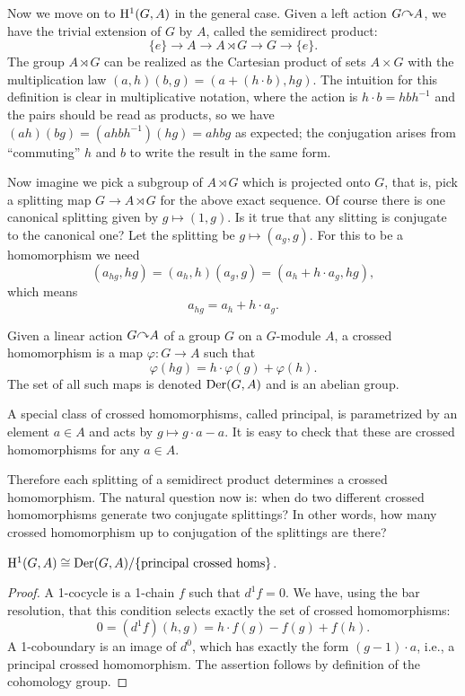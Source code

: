 Now we move on to $\mathrm{H}^1(G,A)$ in the general case. Given a left action $G\acts A$, we have the trivial extension of $G$ by $A$, called the semidirect product:
\[\{e\}\to A\to A\rtimes G \to G\to \{e\}.\]
The group $A\rtimes G$ can be realized as the Cartesian product of sets $A\times G$ with the multiplication law $(a,h)(b,g)=(a+(h\cdot b),hg)$. The intuition for this definition is clear in multiplicative notation, where the action is $h\cdot b=hbh^{-1}$ and the pairs should be read as products, so we have $(ah)(bg)=(ahbh^{-1})(hg)=ahbg$ as expected; the conjugation arises from ``commuting'' $h$  and $b$ to write the result in the same form.

Now imagine we pick a subgroup of $A\rtimes G$ which is projected onto $G$, that is, pick a splitting map $G\to A\rtimes G$ for the above exact sequence. Of course there is one canonical splitting given by $g\mapsto (1,g)$. Is it true that any slitting is conjugate to the canonical one? Let the splitting be $g\mapsto (a_g,g)$. For this to be a homomorphism we need
\[ (a_{hg},hg)=(a_h,h)(a_g,g)=(a_h +h\cdot a_g,hg),\]
which means
\[a_{hg}=a_h + h\cdot a_g.\]

\begin{defn}
    Given a linear action $G\acts A$ of a group $G$ on a $G$-module $A$, a crossed homomorphism is a map $\varphi:G\to A$ such that 
    \[\varphi(hg)=h\cdot \varphi(g)+\varphi(h).\]
    The set of all such maps is denoted $\operatorname{Der}(G,A)$ and is an abelian group.
\end{defn}
\begin{defn}
    A special class of crossed homomorphisms, called principal, is parametrized by an element $a\in A$ and acts by $g\mapsto g\cdot a-a$. It is easy to check that these are crossed homomorphisms for any $a\in A$.
\end{defn}

Therefore each splitting of a semidirect product determines a crossed homomorphism. The natural question now is: when do two different crossed homomorphisms generate two conjugate splittings? In other words, how many crossed homomorphism up to conjugation of the splittings are there?

\begin{thm}
$\mathrm{H}^1(G,A)\cong \operatorname{Der}(G,A)\slash \{\text{principal crossed homs}\}$.
\end{thm}
\begin{proof}
    A 1-cocycle is a 1-chain $f$ such that $d^1f=0$. We have, using the bar resolution, that this condition selects exactly the set of crossed homomorphisms:
    \[0=(d^1f)(h,g)=h\cdot f(g)-f(g)+f(h).\]
    A 1-coboundary is an image of $d^0$, which has exactly the form $(g-1)\cdot a$, i.e., a principal crossed homomorphism. The assertion follows by definition of the cohomology group.
\end{proof}


